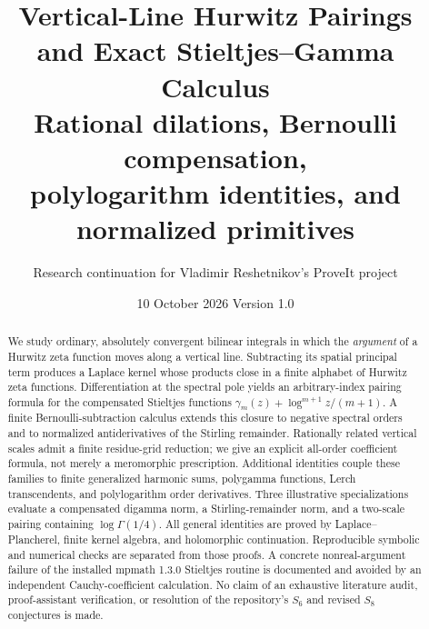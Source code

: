 \documentclass[11pt,a4paper]{article}
\title{\vspace{-12mm}\textbf{Vertical-Line Hurwitz Pairings\\and Exact Stieltjes--Gamma Calculus}\\[3mm]
\large Rational dilations, Bernoulli compensation,\\polylogarithm identities, and normalized primitives}
\author{Research continuation for Vladimir Reshetnikov's ProveIt project}
\date{10 October 2026 \quad\textbullet\quad Version 1.0}
\theoremstyle{definition}
\numberwithin{equation}{section}
\begin{document}
\maketitle
\begin{abstract}
We study ordinary, absolutely convergent bilinear integrals in which the
\emph{argument} of a Hurwitz zeta function moves along a vertical line.
Subtracting its spatial principal term produces a Laplace kernel whose
products close in a finite alphabet of Hurwitz zeta functions. Differentiation
at the spectral pole yields an arbitrary-index pairing formula for the
compensated Stieltjes functions
$\gamma_m(z)+\log^{m+1}z/(m+1)$. A finite Bernoulli-subtraction calculus extends
this closure to negative spectral orders and to normalized antiderivatives
of the Stirling remainder. Rationally related vertical scales admit a finite
residue-grid reduction; we give an explicit all-order coefficient formula,
not merely a meromorphic prescription. Additional identities couple these
families to finite generalized harmonic sums, polygamma functions, Lerch
transcendents, and polylogarithm order derivatives. Three illustrative
specializations evaluate a compensated digamma norm, a Stirling-remainder
norm, and a two-scale pairing containing $\log\Gamma(1/4)$.
All general identities are proved by Laplace--Plancherel, finite kernel
algebra, and holomorphic continuation. Reproducible symbolic and numerical
checks are separated from those proofs. A concrete nonreal-argument failure
of the installed mpmath 1.3.0 Stieltjes routine is documented and avoided by
an independent Cauchy-coefficient calculation. No claim of an exhaustive
literature audit, proof-assistant verification, or resolution of the
repository's $S_6$ and revised $S_8$ conjectures is made.
\end{abstract}
\tableofcontents
\clearpage







\clearpage
\end{document}
